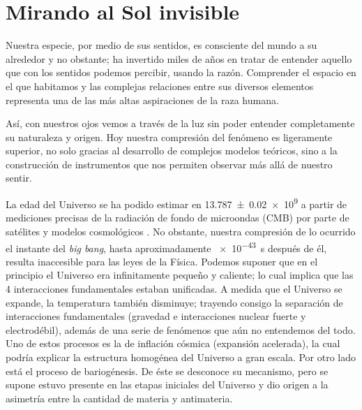 
\chapter{Mirando al Sol invisible}
\label{chap:uno}

Nuestra especie, por medio de sus sentidos, es consciente del mundo a su alrededor y no obstante; ha invertido miles de años en tratar de entender aquello que con los sentidos podemos percibir, usando la razón. Comprender el espacio en el que habitamos y las complejas relaciones entre sus diversos elementos representa una de las más altas aspiraciones de la raza humana.

Así, con nuestros ojos vemos a través de la luz sin poder entender completamente su naturaleza y origen. Hoy nuestra compresión del fenómeno es ligeramente superior, no solo gracias al desarrollo de complejos modelos teóricos, sino a la construcción de instrumentos que nos permiten observar más allá de nuestro sentir.

La edad del Universo se ha podido estimar en \SI{13.787(20)e9}{\year} a partir de mediciones precisas de la radiación de fondo de microondas (CMB) por parte de satélites y modelos cosmológicos \cite{plank18}. No obstante, nuestra compresión de lo ocurrido el instante del \emph{big bang}, hasta aproximadamente \SI{e-43}{\second} después de él, resulta inaccesible para las leyes de la Física. Podemos suponer que en el principio el Universo era infinitamente pequeño y caliente; lo cual implica que las \num{4} interacciones fundamentales estaban unificadas. A medida que el Universo se expande, la temperatura también disminuye; trayendo consigo la separación de interacciones fundamentales (gravedad e interacciones nuclear fuerte y electrodébil), además de una serie de fenómenos que aún no entendemos del todo. Uno de estos procesos es la de inflación cósmica (expansión acelerada), la cual podría explicar la estructura homogénea del Universo a gran escala. Por otro lado está el proceso de bariogénesis. De éste se desconoce su mecanismo, pero se supone estuvo presente en las etapas iniciales del Universo y dio origen a la asimetría entre la cantidad de materia y antimateria.

